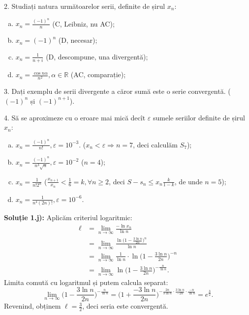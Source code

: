 \documentclass[11pt,a4paper]{article}
\newcommand\RR{\mathbb{R}}
\theoremstyle{dotless}
\theoremstyle{dotlessdr}
\begin{document}
\vspace{1cm}

2. Studiați natura următoarelor serii, definite de șirul $x_n$:
\begin{enumerate}[(a)]
  \item $x_n = \frac{(-1)^n}{n}$ (C, Leibniz, nu AC);
  \item $x_n = (-1)^n$ (D, necesar);
  \item $x_n = \frac{1}{n + i}$ (D, descompune, una divergentă);
  \item $x_n = \frac{\cos n \alpha}{n^2}, \alpha \in \RR$ (AC, comparație);
\end{enumerate}

\vspace{1cm}

3. Dați exemplu de serii divergente a căror sumă este o serie convergentă.
($(-1)^n$ și $(-1)^{n + 1}$).

\vspace{1cm}

4. Să se aproximeze cu o eroare mai mică decît $\varepsilon$ sumele
seriilor definite de șirul $x_n$:
\begin{enumerate}[(a)]
  \item $x_n = \frac{(-1)^n}{n!}, \varepsilon = 10^{-3}$. ($x_n < \varepsilon \Rightarrow n = 7$,
    deci calculăm $S_7$);
  \item $x_n = \frac{(-1)^n}{n^3 \sqrt{n}}, \varepsilon = 10^{-2}$ ($n = 4$);
  \item $x_n = \frac{1}{n! 2^n}$ ($\frac{x_{n + 1}}{x_n} < \frac{1}{6} = k, \forall n \geq 2$,
    deci $S - s_n \leq x_n \frac{k}{1 - k}$, de unde $n = 5$);
  \item $x_n = \frac{1}{n^4 (2n)!}, \varepsilon = 10^{-6}$.
\end{enumerate}

\vspace{1cm} 
{\color{red}
  \textbf{Soluție 1.j):} Aplicăm criteriul logaritmic:
  \begin{align*}
    \ell &= \lim_{n \to \infty} \frac{-\ln x_n}{\ln n} \\
         &= \lim_{n \to \infty} \frac{\ln \big( 1 - \frac{3 \ln n}{2n} \big)^n}{\ln n} \\
         &= \lim_{n \to \infty} \frac{1}{\ln n} \cdot \ln \Big( 1 - \frac{3 \ln n}{2n} \Big)^{-n} \\
         &= \lim_{n \to \infty} \ln \Big( 1 - \frac{3 \ln n}{2n} \Big)^{-\frac{n}{\ln n}}.
  \end{align*}
  Limita comută cu logaritmul și putem calcula separat:
  \[
    \lim_{n \to \infty} \Big( 1 - \frac{3 \ln n}{2n} \Big)^{-\frac{n}{\ln n}} = %
    \Big( 1 + \frac{-3\ln n}{2n} \Big)^{-\frac{2n}{3 \ln n} \cdot \frac{3 \ln n}{-2n} \cdot \frac{-n}{\ln n}} = e^{\frac{3}{2}}.
  \]
  Revenind, obținem $\ell = \frac{3}{2}$, deci seria este convergentă.}
\end{document}
